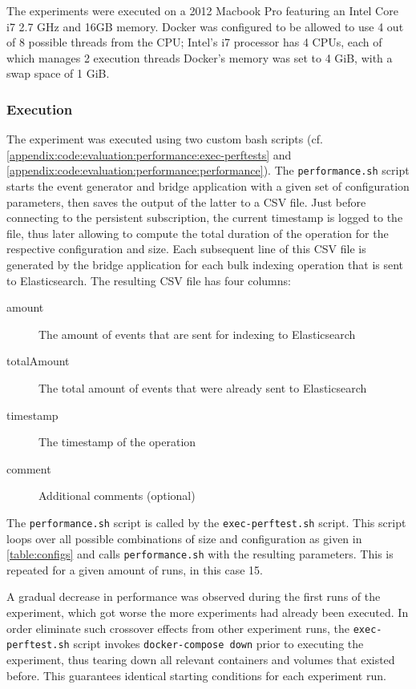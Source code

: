 The experiments were executed on a 2012 Macbook Pro featuring an Intel Core i7 2.7 GHz and 16GB memory.
Docker was configured to be allowed to use 4 out of 8 possible threads from the CPU; Intel's i7 processor has 4 CPUs, each of which manages 2 execution threads
Docker's memory was set to 4 GiB, with a swap space of 1 GiB.

\subsubsection{Execution}

The experiment was executed using two custom bash scripts (cf. \cref{appendix:code:evaluation:performance:exec-perftests} and \cref{appendix:code:evaluation:performance:performance}).
The \texttt{performance.sh} script starts the event generator and bridge application with a given set of configuration parameters, then saves the output of the latter to a CSV file.
Just before connecting to the persistent subscription, the current timestamp is logged to the file, thus later allowing to compute the total duration of the operation for the respective configuration and size.
Each subsequent line of this CSV file is generated by the bridge application for each bulk indexing operation that is sent to Elasticsearch.
The resulting CSV file has four columns:

\begin{description}
\item[amount] The amount of events that are sent for indexing to Elasticsearch
\item[totalAmount] The total amount of events that were already sent to Elasticsearch
\item[timestamp] The timestamp of the operation
\item[comment] Additional comments (optional)
\end{description}

The \texttt{performance.sh} script is called by the \texttt{exec-perftest.sh} script.
This script loops over all possible combinations of size and configuration as given in \cref{table:configs} and calls \texttt{performance.sh} with the resulting parameters.
This is repeated for a given amount of runs, in this case 15.

A gradual decrease in performance was observed during the first runs of the experiment, which got worse the more experiments had already been executed.
In order eliminate such crossover effects from other experiment runs, the \texttt{exec-perftest.sh} script invokes \texttt{docker-compose down} prior to executing the experiment, thus tearing down all relevant containers and volumes that existed before.
This guarantees identical starting conditions for each experiment run.

